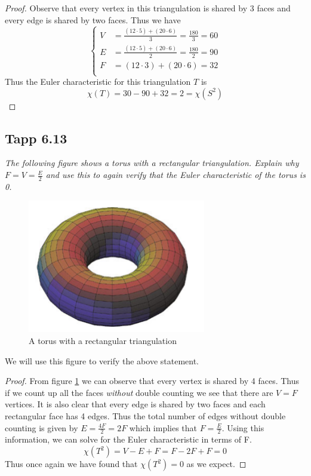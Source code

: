 \documentclass[a4paper, 11pt]{article}
\begin{document}
		\begin{proof}
			Observe that every vertex in  this triangulation is shared by 3 faces and every edge is shared by two faces. Thus we have 
				\begin{equation*}
					\begin{cases}
						V &= \frac{(12\cdot 5)+(20\cdot 6)}{3} = \frac{180}{3} =60 \\
						E &=  \frac{(12\cdot 5)+(20\cdot 6)}{2} = \frac{180}{2} = 90 \\ 
						F &= (12\cdot 3)+(20\cdot 6) = 32 \\ 
					\end{cases}
				\end{equation*}
			Thus the Euler characteristic for this triangulation $T$ is
				\begin{equation*}
					\chi(T) = 30-90+32 = 2 = \chi(S^2) 
				\end{equation*}
		\end{proof}

\subsection*{Tapp 6.13}
	\textit{The following figure shows a torus with a rectangular triangulation. Explain why $F = V = \frac{E}{2}$ and use this to again verify that the Euler characteristic of the torus is 0. }\\
	
	\begin{figure}[!hbt]
		\centering
		\includegraphics[width=0.45\columnwidth]{torusWithRectangulation}
		\caption{A torus with a rectangular triangulation} 
		\label{fig:torus} 
	\end{figure}
	
	\noindent We will use this figure to verify the above statement. \\ 
	
	\begin{proof}
		From figure \ref{fig:torus} we can observe that every vertex is shared by 4 faces. Thus if we count up all the faces \textit{without} double counting we see that there are $V=F$ vertices. It is also clear that every edge is shared by two faces and each rectangular face has 4 edges. Thus the total number of edges without double counting is given by $E = \frac{4F}{2} = 2F$ which implies that $F = \frac{E}{2}$. Using this information, we can solve for the Euler characteristic in terms of F. 
			\begin{equation*}
				\chi(T^2) = V-E+F = F-2F+F = 0
			\end{equation*}
		Thus once again we have found that $\chi(T^2) =0$ as we expect. 
	\end{proof}
	
\end{document}
